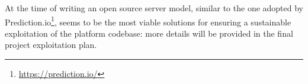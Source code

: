 At the time of writing an open source server model, similar to the one adopted by Prediction.io\footnote{\url{https://prediction.io/}}, seems to be the most viable solutions for ensuring a sustainable exploitation of the platform codebase: more details will be provided in the final project exploitation plan.






